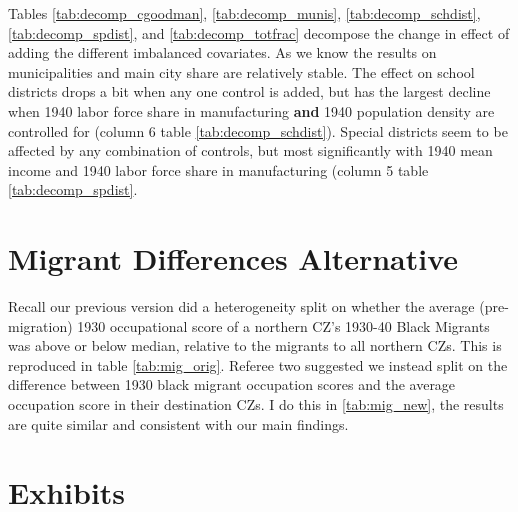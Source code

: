 \documentclass{article}
\begin{document}
Tables \ref{tab:decomp_cgoodman}, \ref{tab:decomp_munis}, \ref{tab:decomp_schdist}, \ref{tab:decomp_spdist}, and \ref{tab:decomp_totfrac} decompose the change in effect of adding the different imbalanced covariates. As we know the results on municipalities and main city share are relatively stable. The effect on school districts drops a bit when any one control is added, but has the largest decline when 1940 labor force share in manufacturing \textbf{and} 1940 population density are controlled for (column 6 table \ref{tab:decomp_schdist}). Special districts seem to be affected by any combination of controls, but most significantly with 1940 mean income and 1940 labor force share in manufacturing (column 5 table \ref{tab:decomp_spdist}.

\section{Migrant Differences Alternative}
Recall our previous version did a heterogeneity split on whether the average (pre-migration) 1930 occupational score of a northern CZ's 1930-40 Black Migrants was above or below median, relative to the migrants to all northern CZs. This is reproduced in table \ref{tab:mig_orig}. Referee two suggested we instead split on the difference between 1930 black migrant occupation scores and the average occupation score in their destination CZs. I do this in \ref{tab:mig_new}, the results are quite similar and consistent with our main findings. 
\clearpage
\section*{Exhibits}

\clearpage
\begin{table}
\footnotesize
\centering
\caption{Main results}
\begin{threeparttable}
\footnotesize

\end{threeparttable}
\label{tab:main_effect}
\end{table}
\clearpage


\clearpage
\begin{table}
\footnotesize
\centering
\caption{Main results, Log Difference and 1940 pop control}
\begin{threeparttable}
\footnotesize

\end{threeparttable}
\label{tab:log_effect}
\end{table}
\clearpage
\end{document}
